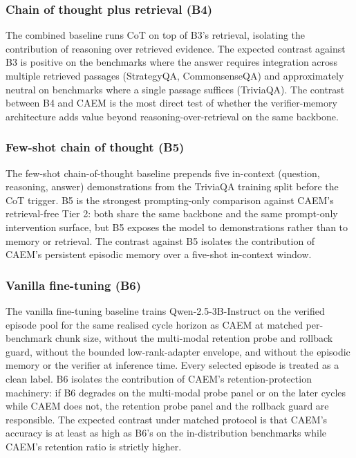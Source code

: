 \subsubsection{Chain of thought plus retrieval (B4)}
\label{sec:comp-cot-rag}

The combined baseline runs CoT on top of B3's retrieval, isolating the contribution of reasoning over retrieved evidence. The expected contrast against B3 is positive on the benchmarks where the answer requires integration across multiple retrieved passages (StrategyQA, CommonsenseQA) and approximately neutral on benchmarks where a single passage suffices (TriviaQA). The contrast between B4 and CAEM is the most direct test of whether the verifier-memory architecture adds value beyond reasoning-over-retrieval on the same backbone.

\subsubsection{Few-shot chain of thought (B5)}
\label{sec:comp-fewshot}

The few-shot chain-of-thought baseline prepends five in-context (question, reasoning, answer) demonstrations from the TriviaQA training split before the CoT trigger. B5 is the strongest prompting-only comparison against CAEM's retrieval-free Tier 2: both share the same backbone and the same prompt-only intervention surface, but B5 exposes the model to demonstrations rather than to memory or retrieval. The contrast against B5 isolates the contribution of CAEM's persistent episodic memory over a five-shot in-context window.

\subsubsection{Vanilla fine-tuning (B6)}
\label{sec:comp-vanilla-ft}

The vanilla fine-tuning baseline trains Qwen-2.5-3B-Instruct on the verified episode pool for the same realised cycle horizon as CAEM at matched per-benchmark chunk size, without the multi-modal retention probe and rollback guard, without the bounded low-rank-adapter envelope, and without the episodic memory or the verifier at inference time. Every selected episode is treated as a clean label. B6 isolates the contribution of CAEM's retention-protection machinery: if B6 degrades on the multi-modal probe panel or on the later cycles while CAEM does not, the retention probe panel and the rollback guard are responsible. The expected contrast under matched protocol is that CAEM's accuracy is at least as high as B6's on the in-distribution benchmarks while CAEM's retention ratio is strictly higher.


